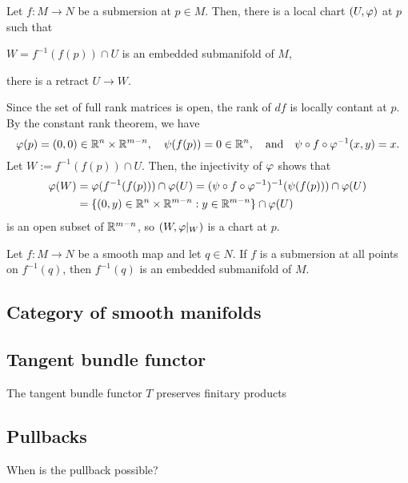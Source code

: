 \documentclass{../exp}
\begin{document}
\begin{cor}
Let $f:M\to N$ be a submersion at $p\in M$.
Then, there is a local chart $(U,\varphi)$ at $p$ such that
\begin{cond}
\item $W=f^{-1}(f(p))\cap U$ is an embedded submanifold of $M$,
\item there is a retract $U\to W$.
\end{cond}
\end{cor}
\begin{pf}
Since the set of full rank matrices is open, the rank of $df$ is locally contant at $p$.
By the constant rank theorem, we have
\[\f(p)=(0,0)\in\R^n\x\R^{m-n},\quad\psi(f(p))=0\in\R^n,\quad\text{and}\quad\psi\o f\o\f^{-1}(x,y)=x.\]
Let $W:=f^{-1}(f(p))\cap U$.
Then, the injectivity of $\varphi$ shows that
\begin{align*}
\f(W)&=\f(f^{-1}(f(p)))\cap\f(U)=(\psi\o f\o\f^{-1})^{-1}(\psi(f(p)))\cap\f(U)\\
&=\{(0,y)\in\R^n\x\R^{m-n}:y\in\R^{m-n}\}\cap\f(U)
\end{align*}
is an open subset of $\mathbb{R}^{m-n}$, so $(W,\varphi|_W)$ is a chart at $p$.
\end{pf}
\begin{cor}
Let $f:M\to N$ be a smooth map and let $q\in N$.
If $f$ is a submersion at all points on $f^{-1}(q)$, then $f^{-1}(q)$ is an embedded submanifold of $M$.
\end{cor}

\subsection{Category of smooth manifolds}


\subsection{Tangent bundle functor}

\begin{thm}
The tangent bundle functor $T$ preserves finitary products
\end{thm}


\subsection{Pullbacks}
When is the pullback possible?
\end{document}
